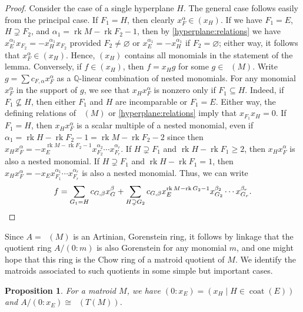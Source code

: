 \documentclass[11pt, reqno]{amsart}
\DeclareMathOperator{\Chow}{\underline{CH}}		%
\DeclareMathOperator{\coat}{coat}
\renewcommand{\emptyset}{\varnothing}
\newcommand{\iso}{\cong}
\newcommand{\QQ}{\mathbb{Q}}
\DeclareMathOperator{\rk}{rk}
\newtheorem{prop}[thm]{Proposition}
\theoremstyle{definition}
\numberwithin{equation}{section}
\numberwithin{table}{section}
\begin{document}
\begin{spacing}{1.1}
\begin{proof}
Consider the case of a single hyperplane $H$.  The general case follows easily from the principal case.  If $F_1 = H$, then clearly $x_F^\alpha \in (x_H)$.  If we have $F_1 = E$, $H \supsetneq F_2$, and $\alpha_1 = \rk M - \rk F_2 - 1$, then by \eqref{hyperplane:relations} we have $x_E^{\alpha_1}x_{F_2} = - x_H^{\alpha_1}x_{F_2}$ provided $F_2 \neq \emptyset$ or $x_E^{\alpha_1} = -x_H^{\alpha_1}$ if $F_2 = \emptyset$; either way, it follows that $x_F^\alpha \in (x_H)$.  Hence, $(x_H)$ contains all monomials in the statement of the lemma.  Conversely, if $f \in (x_H)$, then $f = x_Hg$ for some $g \in \Chow(M)$.  Write $g = \sum c_{F, \alpha} x_F^\alpha$ as a $\QQ$-linear combination of nested monomials.  For any monomial $x_F^\alpha$ in the support of $g$, we see that $x_Hx_F^\alpha$ is nonzero only if $F_1 \subseteq H$.  Indeed, if $F_1 \nsubseteq H$, then either $F_1$ and $H$ are incomparable or $F_1 = E$.  Either way, the defining relations of $\Chow(M)$ or \eqref{hyperplane:relations} imply that $x_{F_1}x_H = 0$.  If $F_1 = H$, then $x_Hx_F^\alpha$ is a scalar multiple of a nested monomial, even if $\alpha_1 = \rk H - \rk F_2 - 1 = \rk M - \rk F_2 - 2$ since then $x_Hx_F^\alpha = -x_E^{\rk M - \rk F_2 -1}x_{F_2}^{\alpha_2} \cdots x_{F_r}^{\alpha_r}$.  If $H \supsetneq F_1$ and $\rk H - \rk F_1 \geq 2$, then $x_Hx_F^\alpha$ is also a nested monomial.  If $H \supsetneq F_1$ and $\rk H - \rk F_1  = 1$, then $x_Hx_F^\alpha = -x_Ex_{F_1}^{\alpha_1} \cdots x_{F_r}^{\alpha_r}$ is also a nested monomial.  Thus, we can write 
\[ f = \sum_{G_1 = H} c_{G, \beta} x_G^\beta + \sum_{H \supsetneq G_2} c_{G, \beta} x_E^{\rk M - \rk G_2 - 1}x_{G_2}^{\beta_2} \cdots x_{G_r}^{\beta_r}. \qedhere
\]
\end{proof}

Since $A = \Chow(M)$ is an Artinian, Gorenstein ring, it follows by linkage \cite[Remark 2.7]{HU87} that the quotient ring $A/(0 : m)$ is also Gorenstein for any monomial $m$, and one might hope that this ring is the Chow ring of a matroid quotient of $M$.  We identify the matroids associated to such quotients in some simple but important cases.

\begin{prop} \label{truncation} 
For a matroid $M$, we have $(0 : x_E) = (x_H \mid H \in \coat(E))$ and $A/(0 : x_E) \iso \Chow(T(M))$. 
\end{prop}


\end{spacing}
\end{document}
